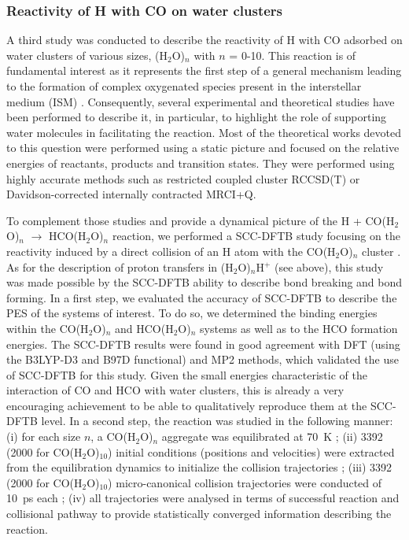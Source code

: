 \documentclass[]{interact}
\theoremstyle{plain}%
\theoremstyle{definition}
\theoremstyle{remark}
\begin{document}
\subsubsection{Reactivity of H with CO on water clusters}  \label{reactivity}

A third study was conducted to  describe the reactivity of H with CO 
adsorbed on water clusters of various sizes, (H$_{2}$O)$_{n}$ with $n$ = 0-10. This reaction is of fundamental interest
as it represents the first step of a general mechanism leading to the formation of complex oxygenated species present
in the interstellar medium (ISM) \cite{book1,tielens1,crovisier1,watanabe2,watanabe3,hidaka1}. Consequently, several
experimental \cite{hiraoka1,hiraoka2,pirim1,watanabe1,watanabe2} and theoretical \cite{woon1,cao1,woon2,rimola1,peters1}
studies have been performed to describe it, in particular, to highlight the role of supporting water molecules in facilitating
the reaction. Most of the theoretical works devoted to this question were performed using a static picture and focused
on the relative energies of reactants, products and transition states. They were performed using highly accurate
methods such as restricted coupled cluster RCCSD(T) or Davidson-corrected internally contracted MRCI+Q.

To complement those studies and provide a dynamical picture of the H + CO(H$_{2}$O)$_{n}$ $\rightarrow$ HCO(H$_{2}$O)$_{n}$
reaction, we performed a SCC-DFTB study focusing on the reactivity induced by a direct collision of an H atom with
the CO(H$_{2}$O)$_{n}$ cluster \cite{Korchagina2017a}.  As for the description of proton transfers in (H$_{2}$O)$_{n}$H$^{+}$
(see above), this study was made possible by the SCC-DFTB ability  to describe bond breaking and bond
forming. In a first step, we evaluated the accuracy of SCC-DFTB to describe the PES of the systems of interest. To do so,
we determined the binding energies within the CO(H$_{2}$O)$_{n}$ and HCO(H$_{2}$O)$_{n}$ systems as well as to the HCO
formation energies. The SCC-DFTB results were found in good agreement with DFT (using the B3LYP-D3 and B97D functional)
and MP2 methods, which validated the use of SCC-DFTB for this study. Given the small energies characteristic of the
interaction of CO and HCO with water clusters, this is already a very encouraging achievement to be able to qualitatively
reproduce them at the SCC-DFTB level. In a second step, the reaction was studied in the following manner: (i) for each size $n$,
a CO(H$_{2}$O)$_{n}$ aggregate was equilibrated at 70~K ; (ii) 3392 (2000 for CO(H$_{2}$O)$_{10}$) initial conditions
(positions and velocities) were extracted from the equilibration dynamics to initialize the collision trajectories ; (iii)
3392 (2000 for CO(H$_{2}$O)$_{10}$)  micro-canonical collision trajectories were conducted of 10~ps each ; (iv) all
trajectories were analysed in terms of successful reaction and collisional pathway to provide statistically converged
information describing the reaction. 
\end{document}
